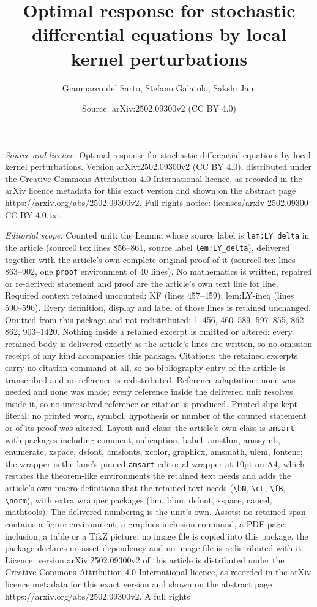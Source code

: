 \documentclass[10pt,a4paper]{amsart}
\title[Optimal response for stochastic differential equations by lo]{Optimal response for stochastic differential equations by local kernel perturbations}
\author{Gianmarco del Sarto, Stefano Galatolo, Sakshi Jain}
\date{Source: arXiv:2502.09300v2 (CC BY 4.0)}
\begin{document}
\maketitle

\noindent\emph{Source and licence.} Optimal response for stochastic differential equations by local kernel perturbations. Version arXiv:2502.09300v2 (CC BY 4.0), distributed under the Creative Commons Attribution 4.0 International licence, as recorded in the arXiv licence metadata for this exact version and shown on the abstract page https://arxiv.org/abs/2502.09300v2. Full rights notice: licenses/arxiv-2502.09300-CC-BY-4.0.txt.\par\smallskip

\noindent\textit{Editorial scope.} Counted unit: the Lemma whose source label is \texttt{lem:LY\_delta} in the article (source0.tex lines 856--861, source label \texttt{lem:LY\_delta}), delivered together with the article's own complete original proof of it (source0.tex lines 863--902, one \texttt{proof} environment of 40 lines). No mathematics is written, repaired or re-derived: statement and proof are the article's own text line for line. Required context retained uncounted: KF (lines 457--459); lem:LY-ineq (lines 590--596). Every definition, display and label of those lines is retained unchanged. Omitted from this package and not redistributed: 1--456, 460--589, 597--855, 862--862, 903--1420. Nothing inside a retained excerpt is omitted or altered: every retained body is delivered exactly as the article's lines are written, so no omission receipt of any kind accompanies this package. Citations: the retained excerpts carry no citation command at all, so no bibliography entry of the article is transcribed and no reference is redistributed. Reference adaptation: none was needed and none was made; every reference inside the delivered unit resolves inside it, so no unresolved reference or citation is produced. Printed slips kept literal: no printed word, symbol, hypothesis or number of the counted statement or of its proof was altered. Layout and class: the article's own class is \texttt{amsart} with packages including comment, subcaption, babel, amsthm, amssymb, enumerate, xspace, dsfont, amsfonts, xcolor, graphicx, amsmath, ulem, fontenc; the wrapper is the lane's pinned \texttt{amsart} editorial wrapper at 10pt on A4, which restates the theorem-like environments the retained text needs and adds the article's own macro definitions that the retained text needs (\texttt{\textbackslash bN}, \texttt{\textbackslash cL}, \texttt{\textbackslash fB}, \texttt{\textbackslash norm}), with extra wrapper packages (bm, bbm, dsfont, xspace, cancel, mathtools). The delivered numbering is the unit's own. Assets: no retained span contains a figure environment, a graphics-inclusion command, a PDF-page inclusion, a table or a TikZ picture; no image file is copied into this package, the package declares no asset dependency and no image file is redistributed with it. Licence: version arXiv:2502.09300v2 of this article is distributed under the Creative Commons Attribution 4.0 International licence, as recorded in the arXiv licence metadata for this exact version and shown on the abstract page https://arxiv.org/abs/2502.09300v2. A full rights 
\end{document}
